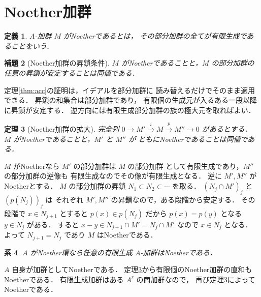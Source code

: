 \documentclass[a5paper,10pt,onecolumn]{jsarticle}
\makeatletter
\theoremstyle{mathnotetheorem}
\newtheorem{theorem}{定理}[section]
\newtheorem{definition}[theorem]{定義}
\newtheorem{lemma}[theorem]{補題}
\newtheorem{corollary}[theorem]{系}
\renewcommand{\proofname}{証明}
\renewenvironment{proof}[1][\proofname]{%
  \par\pushQED{\qed}\normalfont\topsep4\p@\@plus2\p@\relax
  \trivlist\item[\hskip\labelsep\bfseries #1]\ignorespaces
}{\popQED\endtrivlist\@endpefalse}
\makeatother
\begin{document}
\section{Noether加群}
\begin{definition}
$A$-加群 $M$ がNoetherであるとは，
その部分加群の全てが有限生成であることをいう．
\end{definition}
\begin{lemma}[Noether加群の昇鎖条件]
$M$ がNoetherであることと，$M$ の部分加群の
任意の昇鎖が安定することは同値である．
\end{lemma}
\begin{proof}
定理\ref{thm:acc}の証明は，イデアルを部分加群に
読み替えるだけでそのまま適用できる．
昇鎖の和集合は部分加群であり，
有限個の生成元が入るある一段以降に昇鎖が安定する．
逆方向には有限生成部分加群の族の極大元を取ればよい．
\end{proof}
\begin{theorem}[Noether加群の拡大]\label{thm:exact}
完全列 $0\to M'\overset{i}\to M\overset{p}\to M''\to0$
があるとする．
$M$ がNoetherであることと，$M'$ と $M''$ が
ともにNoetherであることは同値である．
\end{theorem}
\begin{proof}
$M$ がNoetherなら $M'$ の部分加群は $M$ の部分加群
として有限生成であり，$M''$ の部分加群の逆像も
有限生成なのでその像が有限生成となる．
逆に $M',M''$ がNoetherとする．
$M$ の部分加群の昇鎖 $N_1\subset N_2\subset\cdots$ を取る．
$(N_j\cap M')_j$ と $(p(N_j))_j$ は
それぞれ $M',M''$ の昇鎖なので，ある段階から安定する．
その段階で $x\in N_{j+1}$ とすると
$p(x)\in p(N_j)$ だから
$p(x)=p(y)$ となる $y\in N_j$ がある．
すると $x-y\in N_{j+1}\cap M'=N_j\cap M'$ なので
$x\in N_j$ となる．
よって $N_{j+1}=N_j$ であり $M$ はNoetherである．
\end{proof}
\begin{corollary}
$A$ がNoether環なら任意の有限生成 $A$-加群はNoetherである．
\end{corollary}
\begin{proof}
$A$ 自身が加群としてNoetherである．
定理\ref{thm:exact}から有限個のNoether加群の直和も
Noetherである．
有限生成加群はある $A^r$ の商加群なので，
再び定理\ref{thm:exact}によってNoetherである．
\end{proof}
\end{document}
